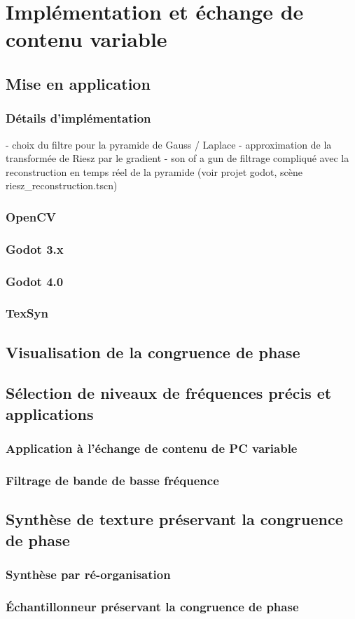 \chapter{Implémentation et échange de contenu variable}
\label{chap:chapitre4}

\section{Mise en application}

\subsection{Détails d'implémentation}
- choix du filtre pour la pyramide de Gauss / Laplace
- approximation de la transformée de Riesz par le gradient
- son of a gun de filtrage compliqué avec la reconstruction en temps réel de la pyramide (voir projet godot, scène riesz_reconstruction.tscn)

\subsection{OpenCV}
\subsection{Godot 3.x}
\subsection{Godot 4.0}
\subsection{TexSyn}

\section{Visualisation de la congruence de phase}

\section{Sélection de niveaux de fréquences précis et applications}

\subsection{Application à l'échange de contenu de PC variable}

\subsection{Filtrage de bande de basse fréquence}

\section{Synthèse de texture préservant la congruence de phase}

\subsection{Synthèse par ré-organisation}

\subsection{Échantillonneur préservant la congruence de phase}
